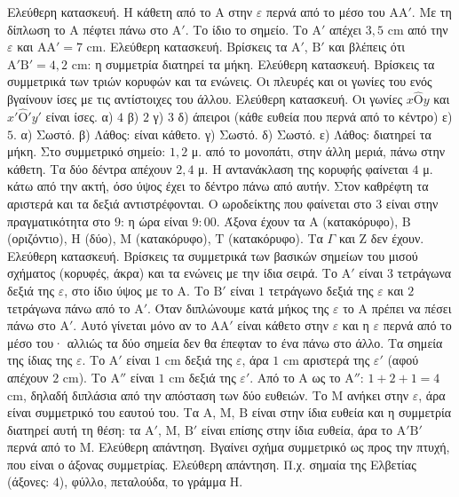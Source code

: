 Ελεύθερη κατασκευή. Η κάθετη από το $\mathrm{Α}$ στην $\varepsilon$ περνά από το μέσο του $\mathrm{ΑΑ}'$. Με τη δίπλωση το $\mathrm{Α}$ πέφτει πάνω στο $\mathrm{Α}'$.
 Το ίδιο το σημείο.
 Το $\mathrm{Α}'$ απέχει $3{,}5$ cm από την $\varepsilon$ και $\mathrm{ΑΑ}'=7$ cm.
 Ελεύθερη κατασκευή. Βρίσκεις τα $\mathrm{Α}'$, $\mathrm{Β}'$ και βλέπεις ότι $\mathrm{Α}'\mathrm{Β}'=4{,}2$ cm: η συμμετρία διατηρεί τα μήκη.
 Ελεύθερη κατασκευή. Βρίσκεις τα συμμετρικά των τριών κορυφών και τα ενώνεις. Οι πλευρές και οι γωνίες του ενός βγαίνουν ίσες με τις αντίστοιχες του άλλου.
 Ελεύθερη κατασκευή. Οι γωνίες $x\hat{\mathrm{Ο}}y$ και $x'\hat{\mathrm{Ο}}'y'$ είναι ίσες.
 α) $4$ \quad β) $2$ \quad γ) $3$ \quad δ) άπειροι (κάθε ευθεία που περνά από το κέντρο) \quad ε) $5$.
 α) Σωστό. β) Λάθος: είναι κάθετο. γ) Σωστό. δ) Σωστό. ε) Λάθος: διατηρεί τα μήκη.
 Στο συμμετρικό σημείο: $1{,}2$ μ. από το μονοπάτι, στην άλλη μεριά, πάνω στην κάθετη. Τα δύο δέντρα απέχουν $2{,}4$ μ.
 Η αντανάκλαση της κορυφής φαίνεται $4$ μ. κάτω από την ακτή, όσο ύψος έχει το δέντρο πάνω από αυτήν.
 Στον καθρέφτη τα αριστερά και τα δεξιά αντιστρέφονται. Ο ωροδείκτης που φαίνεται στο $3$ είναι στην πραγματικότητα στο $9$: η ώρα είναι $9{:}00$.
 Άξονα έχουν τα $\mathrm{Α}$ (κατακόρυφο), $\mathrm{Β}$ (οριζόντιο), $\mathrm{Η}$ (δύο), $\mathrm{Μ}$ (κατακόρυφο), $\mathrm{Τ}$ (κατακόρυφο). Τα $\Gamma$ και $\mathrm{Ζ}$ δεν έχουν.
 Ελεύθερη κατασκευή. Βρίσκεις τα συμμετρικά των βασικών σημείων του μισού σχήματος (κορυφές, άκρα) και τα ενώνεις με την ίδια σειρά.
 Το $\mathrm{Α}'$ είναι $3$ τετράγωνα δεξιά της $\varepsilon$, στο ίδιο ύψος με το $\mathrm{Α}$. Το $\mathrm{Β}'$ είναι $1$ τετράγωνο δεξιά της $\varepsilon$ και $2$ τετράγωνα πάνω από το $\mathrm{Α}'$.
 Όταν διπλώνουμε κατά μήκος της $\varepsilon$ το $\mathrm{Α}$ πρέπει να πέσει πάνω στο $\mathrm{Α}'$. Αυτό γίνεται μόνο αν το $\mathrm{ΑΑ}'$ είναι κάθετο στην $\varepsilon$ και η $\varepsilon$ περνά από το μέσο του· αλλιώς τα δύο σημεία δεν θα έπεφταν το ένα πάνω στο άλλο.
 Τα σημεία της ίδιας της $\varepsilon$.
 Το $\mathrm{Α}'$ είναι $1$ cm δεξιά της $\varepsilon$, άρα $1$ cm αριστερά της $\varepsilon'$ (αφού απέχουν $2$ cm). Το $\mathrm{Α}''$ είναι $1$ cm δεξιά της $\varepsilon'$. Από το $\mathrm{Α}$ ως το $\mathrm{Α}''$: $1+2+1=4$ cm, δηλαδή διπλάσια από την απόσταση των δύο ευθειών.
 Το $\mathrm{Μ}$ ανήκει στην $\varepsilon$, άρα είναι συμμετρικό του εαυτού του. Τα $\mathrm{Α}$, $\mathrm{Μ}$, $\mathrm{Β}$ είναι στην ίδια ευθεία και η συμμετρία διατηρεί αυτή τη θέση: τα $\mathrm{Α}'$, $\mathrm{Μ}$, $\mathrm{Β}'$ είναι επίσης στην ίδια ευθεία, άρα το $\mathrm{Α}'\mathrm{Β}'$ περνά από το $\mathrm{Μ}$.
 Ελεύθερη απάντηση. Βγαίνει σχήμα συμμετρικό ως προς την πτυχή, που είναι ο άξονας συμμετρίας.
 Ελεύθερη απάντηση. Π.χ. σημαία της Ελβετίας (άξονες: $4$), φύλλο, πεταλούδα, το γράμμα Η.
